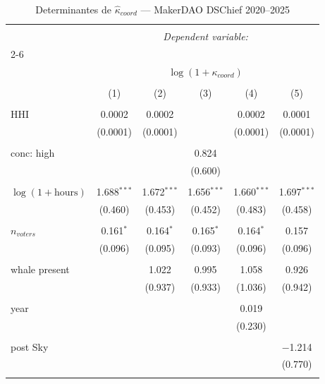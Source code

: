 
\begin{table}[!htbp] \centering 
  \caption{Determinantes de $\hat{\kappa}_{coord}$ — MakerDAO DSChief 2020--2025} 
  \label{tab:kcoord_reg} 
\begin{tabular}{@{\extracolsep{5pt}}lccccc} 
\\[-1.8ex]\hline 
\hline \\[-1.8ex] 
 & \multicolumn{5}{c}{\textit{Dependent variable:}} \\ 
\cline{2-6} 
\\[-1.8ex] & \multicolumn{5}{c}{$\log(1 + \kappa_{coord})$} \\ 
\\[-1.8ex] & (1) & (2) & (3) & (4) & (5)\\ 
\hline \\[-1.8ex] 
 HHI & 0.0002 & 0.0002 &  & 0.0002 & 0.0001 \\ 
  & (0.0001) & (0.0001) &  & (0.0001) & (0.0001) \\ 
  & & & & & \\ 
 conc: high &  &  & 0.824 &  &  \\ 
  &  &  & (0.600) &  &  \\ 
  & & & & & \\ 
 $\log(1 + \text{hours})$ & 1.688$^{***}$ & 1.672$^{***}$ & 1.656$^{***}$ & 1.660$^{***}$ & 1.697$^{***}$ \\ 
  & (0.460) & (0.453) & (0.452) & (0.483) & (0.458) \\ 
  & & & & & \\ 
 $n_{voters}$ & 0.161$^{*}$ & 0.164$^{*}$ & 0.165$^{*}$ & 0.164$^{*}$ & 0.157 \\ 
  & (0.096) & (0.095) & (0.093) & (0.096) & (0.096) \\ 
  & & & & & \\ 
 whale present &  & 1.022 & 0.995 & 1.058 & 0.926 \\ 
  &  & (0.937) & (0.933) & (1.036) & (0.942) \\ 
  & & & & & \\ 
 year &  &  &  & 0.019 &  \\ 
  &  &  &  & (0.230) &  \\ 
  & & & & & \\ 
 post Sky &  &  &  &  & $-$1.214 \\ 
  &  &  &  &  & (0.770) \\ 
  & & & & & \\ 

\end{tabular}
\end{table}
